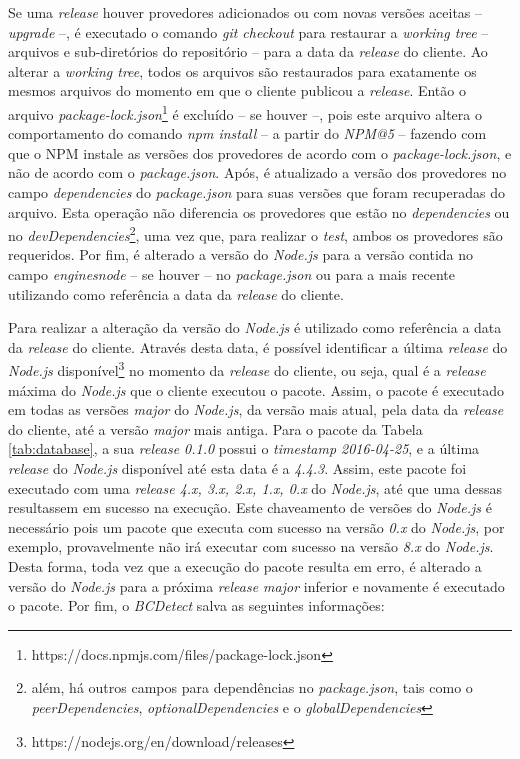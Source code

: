 Se uma \textit{release} houver provedores adicionados ou com novas versões aceitas -- \textit{upgrade} --, é executado o comando \textit{git checkout} para restaurar a \textit{working tree} -- arquivos e sub-diretórios do repositório -- para a data da \textit{release} do cliente. Ao alterar a \textit{working tree}, todos os arquivos são restaurados para exatamente os mesmos arquivos do momento em que o cliente publicou a \textit{release}. Então o arquivo \textit{package-lock.json}\footnote{https://docs.npmjs.com/files/package-lock.json} é excluído -- se houver --, pois este arquivo altera o comportamento do comando \textit{npm install} -- a partir do \textit{NPM@5} -- fazendo com que o \gls{NPM} instale as versões dos provedores de acordo com o \textit{package-lock.json}, e não de acordo com o \textit{package.json}. Após, é atualizado a versão dos provedores no campo \textit{dependencies} do \textit{package.json} para suas versões que foram recuperadas do arquivo. Esta operação não diferencia os provedores que estão no \textit{dependencies} ou no \textit{devDependencies}\footnote{além, há outros campos para dependências no \textit{package.json}, tais como o \textit{peerDependencies}, \textit{optionalDependencies} e o \textit{globalDependencies}}, uma vez que, para realizar o \textit{test}, ambos os provedores são requeridos. Por fim, é alterado a versão do \textit{Node.js} para a versão contida no campo \textit{engines\textrightarrow node} -- se houver -- no \textit{package.json} ou para a mais recente utilizando como referência a data da \textit{release} do cliente.

Para realizar a alteração da versão do \textit{Node.js} é utilizado como referência a data da \textit{release} do cliente. Através desta data, é possível identificar a última \textit{release} do \textit{Node.js} disponível\footnote{https://nodejs.org/en/download/releases} no momento da \textit{release} do cliente, ou seja, qual é a \textit{release} máxima do \textit{Node.js} que o cliente executou o pacote. Assim, o pacote é executado em todas as versões \textit{major} do \textit{Node.js}, da versão mais atual, pela data da \textit{release} do cliente, até a versão \textit{major} mais antiga. Para o pacote da Tabela \ref{tab:database}, a sua \textit{release 0.1.0} possui o \textit{timestamp 2016-04-25}, e a última \textit{release} do \textit{Node.js} disponível até esta data é a \textit{4.4.3}. Assim, este pacote foi executado com uma \textit{release 4.x, 3.x, 2.x, 1.x, 0.x} do \textit{Node.js}, até que uma dessas resultassem em sucesso na execução. Este chaveamento de versões do \textit{Node.js} é necessário pois um pacote que executa com sucesso na versão \textit{0.x} do \textit{Node.js}, por exemplo, provavelmente não irá executar com sucesso na versão \textit{8.x} do \textit{Node.js}. Desta forma, toda vez que a execução do pacote resulta em erro, é alterado a versão do \textit{Node.js} para a próxima \textit{release major} inferior e novamente é executado o pacote. Por fim, o \textit{BCDetect} salva as seguintes informações:

